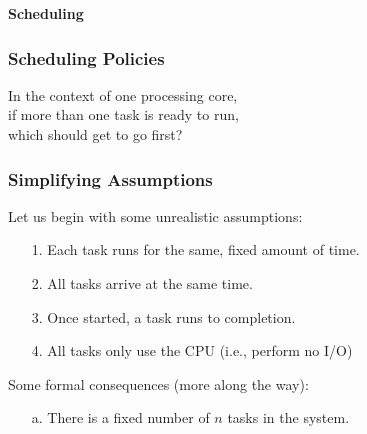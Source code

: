 \begin{frame}

\begin{center}

\Huge \textbf{Scheduling}

\end{center}

\end{frame}


\begin{frame}

\frametitle{Scheduling Policies}

\vspace{\fill}

\begin{center}


In the context of one processing core, \\ if more than one task is ready to
run, \\ which should get to go first?

\end{center}

\vspace{\fill}

\end{frame}



\begin{frame}

\frametitle{Simplifying Assumptions}

Let us begin with some unrealistic assumptions:

\begin{itemize}

\item[1.] Each task runs for the same, fixed amount of time.

\item[2.] All tasks arrive at the same time.

\item[3.] Once started, a task runs to completion.

\item[4.] All tasks only use the CPU (i.e., perform no I/O)


\end{itemize}

\vspace{\fill}

Some formal consequences (more along the way):

\begin{itemize}

\item[a.] There is a fixed number of $n$ tasks in the system.

\end{itemize}

\end{frame}


